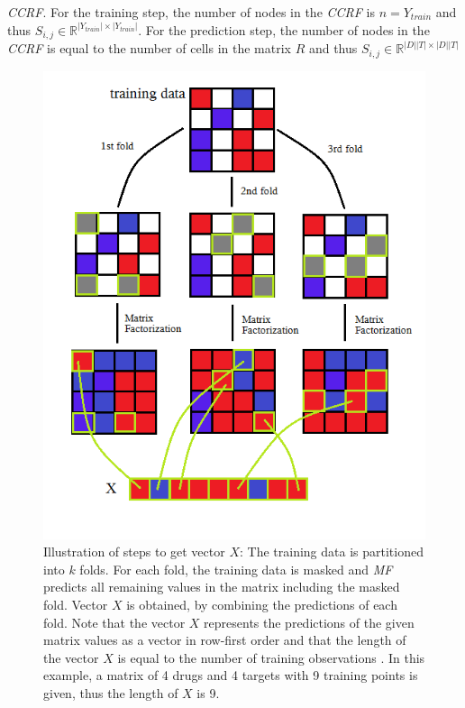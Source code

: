 \textit{CCRF}. For the training step, the number of nodes in the \textit{CCRF} is $n = Y_{train}$
 and thus $S_{i,j} \in \mathbb{R}^{|Y_{train}| \times |Y_{train}|}$. For the prediction step, the number of nodes in the \textit{CCRF} is equal to the number of cells in the matrix $R$ and thus $S_{i,j} \in \mathbb{R}^{|D||T| \times |D||T|}$

\begin{figure}
\begin{center}
\includegraphics[scale=0.6]{ccrf_X.png}
\end{center}
\caption[Illustration of steps to get vector $X$]{\large{Illustration of steps to get vector $X$: The training data is partitioned into $k$ folds. For each fold, the training data is masked and \textit{MF} predicts all remaining values in the matrix including the masked fold. Vector $X$ is obtained, by combining the predictions of each fold. Note that the vector $X$ represents the predictions of the given matrix values as a vector in row-first order and that the length of the vector $X$ is equal to the number of training observations . In this example, a matrix of 4 drugs and 4 targets with 9 training points is given, thus the length of $X$ is 9.}}
\label{fig:ccrf_X}
\end{figure}


